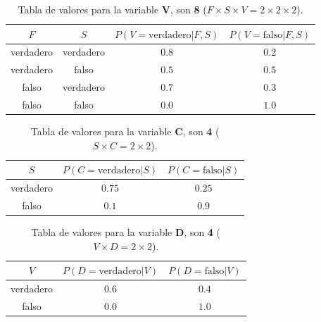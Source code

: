 \documentclass[12pt]{article}
\begin{document}
 \begin{table}[h!]
 	\centering
 	\begin{tabular}{|c|c|c|c|}
 		\hline
 		\rowcolor[gray]{.8}
 		$F$&$S$&$P(V=\text{verdadero}|F,S)$&$P(V=\text{falso}|F,S)$ \\\hline %
 		verdadero & verdadero & $0.8$ &$0.2$\\\hline
 		verdadero & falso & $0.5$ &$0.5$\\\hline
 		falso & verdadero & $0.7$ &$0.3$\\\hline
 		falso & falso & $0.0$ &$1.0$\\\hline
 	\end{tabular}
 	\caption{Tabla de valores para la variable $\pmb{V}$, son \textbf{8} ($F\times S\times V=2\times 2 \times 2$).}
 	\label{tab:ej3004}
 \end{table}
\begin{table}[h!]
	\centering
	\begin{tabular}{|c|c|c|}
		\hline
		\rowcolor[gray]{.8}
		$S$&$P(C=\text{verdadero}|S)$&$P(C=\text{falso}|S)$ \\\hline %
		verdadero & $0.75$ &$0.25$\\\hline
		falso & $0.1$ &$0.9$\\\hline
	\end{tabular}
	\caption{Tabla de valores para la variable $\pmb{C}$, son \textbf{4} ($S\times C=2\times 2$).}
	\label{tab:ej3005}
\end{table}
\begin{table}[h!]
	\centering
	\begin{tabular}{|c|c|c|}
		\hline
		\rowcolor[gray]{.8}
		$V$&$P(D=\text{verdadero}|V)$&$P(D=\text{falso}|V)$ \\\hline %
		verdadero & $0.6$ &$0.4$\\\hline
		falso & $0.0$ &$1.0$\\\hline
	\end{tabular}
	\caption{Tabla de valores para la variable $\pmb{D}$, son \textbf{4} ($V\times D=2\times 2$).}
	\label{tab:ej3006}
\end{table}
\end{document}
